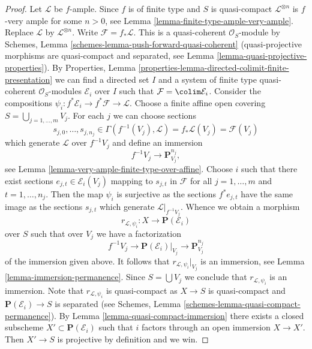 \begin{proof}
Let $\mathcal{L}$ be $f$-ample. Since $f$ is of finite type and $S$ is
quasi-compact $\mathcal{L}^{\otimes n}$ is $f$-very ample for some $n > 0$, see
Lemma \ref{lemma-finite-type-ample-very-ample}.
Replace $\mathcal{L}$ by $\mathcal{L}^{\otimes n}$.
Write $\mathcal{F} = f_*\mathcal{L}$. This is a quasi-coherent
$\mathcal{O}_S$-module by 
Schemes, Lemma \ref{schemes-lemma-push-forward-quasi-coherent}
(quasi-projective morphisms are quasi-compact and
separated, see Lemma \ref{lemma-quasi-projective-properties}). By
Properties, Lemma \ref{properties-lemma-directed-colimit-finite-presentation}
we can find a directed set $I$ and a system of
finite type quasi-coherent $\mathcal{O}_S$-modules $\mathcal{E}_i$
over $I$ such that $\mathcal{F} = \colim \mathcal{E}_i$.
Consider the compositions
$\psi_i : f^*\mathcal{E}_i \to f^*\mathcal{F} \to \mathcal{L}$.
Choose a finite affine open covering $S = \bigcup_{j = 1, \ldots, m} V_j$.
For each $j$ we can choose sections
$$
s_{j, 0}, \ldots, s_{j, n_j} \in
\Gamma(f^{-1}(V_j), \mathcal{L}) = f_*\mathcal{L}(V_j) = \mathcal{F}(V_j)
$$
which generate $\mathcal{L}$ over $f^{-1}V_j$ and define an immersion
$$
f^{-1}V_j \longrightarrow \mathbf{P}^{n_j}_{V_j},
$$
see Lemma \ref{lemma-very-ample-finite-type-over-affine}.
Choose $i$ such that there exist sections $e_{j, t} \in \mathcal{E}_i(V_j)$
mapping to $s_{j, t}$ in $\mathcal{F}$ for all $j = 1, \ldots, m$ and
$t = 1, \ldots, n_j$. Then the map $\psi_i$ is surjective
as the sections $f^*e_{j, t}$ have the same image as the sections $s_{j, t}$
which generate $\mathcal{L}|_{f^{-1}V_j}$. Whence we obtain a morphism
$$
r_{\mathcal{L}, \psi_i} : X \longrightarrow \mathbf{P}(\mathcal{E}_i)
$$
over $S$ such that over $V_j$ we have a factorization
$$
f^{-1}V_j \to \mathbf{P}(\mathcal{E}_i)|_{V_j} \to \mathbf{P}^{n_j}_{V_j}
$$
of the immersion given above. It follows that $r_{\mathcal{L}, \psi_i}|_{V_j}$
is an immersion, see Lemma \ref{lemma-immersion-permanence}.
Since $S = \bigcup V_j$ we conclude that $r_{\mathcal{L}, \psi_i}$
is an immersion.
Note that $r_{\mathcal{L}, \psi_i}$ is quasi-compact as
$X \to S$ is quasi-compact and $\mathbf{P}(\mathcal{E}_i) \to S$ is separated
(see Schemes, Lemma \ref{schemes-lemma-quasi-compact-permanence}).
By Lemma \ref{lemma-quasi-compact-immersion} there exists a closed
subscheme $X' \subset \mathbf{P}(\mathcal{E}_i)$ such that $i$ factors
through an open immersion $X \to X'$. Then $X' \to S$ is projective
by definition and we win.
\end{proof}

